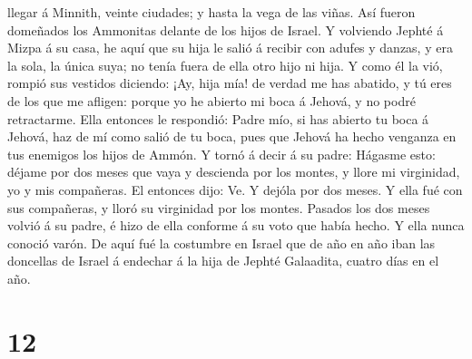 llegar á Minnith, veinte ciudades; y hasta la vega de las viñas. Así
fueron domeñados los Ammonitas delante de los hijos de Israel.
 Y volviendo Jephté á Mizpa á su casa, he aquí que su hija
le salió á recibir con adufes y danzas, y era la sola, la única suya; no
tenía fuera de ella otro hijo ni hija.  Y como él la vió,
rompió sus vestidos diciendo: ¡Ay, hija mía! de verdad me has abatido, y
tú eres de los que me afligen: porque yo he abierto mi boca á Jehová, y
no podré retractarme.  Ella entonces le respondió: Padre
mío, si has abierto tu boca á Jehová, haz de mí como salió de tu boca,
pues que Jehová ha hecho venganza en tus enemigos los hijos de Ammón.
 Y tornó á decir á su padre: Hágasme esto: déjame por dos
meses que vaya y descienda por los montes, y llore mi virginidad, yo y
mis compañeras.  El entonces dijo: Ve. Y dejóla por dos
meses. Y ella fué con sus compañeras, y lloró su virginidad por los
montes.  Pasados los dos meses volvió á su padre, é hizo de
ella conforme á su voto que había hecho. Y ella nunca conoció varón.
 De aquí fué la costumbre en Israel que de año en año iban
las doncellas de Israel á endechar á la hija de Jephté Galaadita, cuatro
días en el año.

\hypertarget{section-11}{%
\section{12}\label{section-11}}

